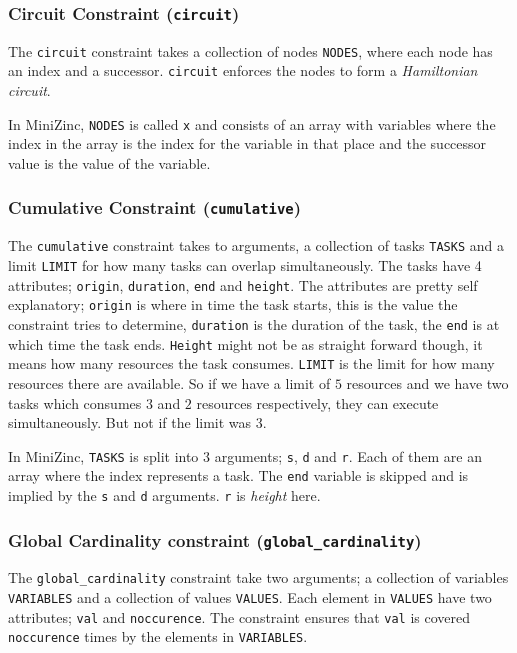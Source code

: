 \subsubsection{Circuit Constraint (\texttt{circuit})}
The \texttt{circuit} constraint takes a collection of nodes \texttt{NODES}, where each node has an index and a successor. \texttt{circuit} enforces the nodes to form a \emph{Hamiltonian circuit}.

In MiniZinc, \texttt{NODES} is called \texttt{x} and consists of an array with variables where the index in the array is the index for the variable in that place and the successor value is the value of the variable.

\subsubsection{Cumulative Constraint (\texttt{cumulative})}
The \texttt{cumulative} constraint takes to arguments, a collection of tasks \texttt{TASKS} and a limit \texttt{LIMIT} for how many tasks can overlap simultaneously. The tasks have 4 attributes; \texttt{origin}, \texttt{duration}, \texttt{end} and \texttt{height}. The attributes are pretty self explanatory; \texttt{origin} is where in time the task starts, this is the value the constraint tries to determine, \texttt{duration} is the duration of the task, the \texttt{end} is at which time the task ends. \texttt{Height} might not be as straight forward though, it means how many resources the task consumes. \texttt{LIMIT} is the limit for how many resources there are available. So if we have a limit of $5$ resources and we have two tasks which consumes $3$ and $2$ resources respectively, they can execute simultaneously. But not if the limit was $3$.

In MiniZinc, \texttt{TASKS} is split into $3$ arguments; \texttt{s}, \texttt{d} and \texttt{r}. Each of them are an array where the index represents a task. The \texttt{end} variable is skipped and is implied by the \texttt{s} and \texttt{d} arguments. \texttt{r} is \emph{height} here.

\subsubsection{Global Cardinality constraint (\texttt{global\_cardinality})}
The \texttt{global\_cardinality} constraint take two arguments; a collection of variables \texttt{VARIABLES} and a collection of values \texttt{VALUES}. Each element in \texttt{VALUES} have two attributes; \texttt{val} and \texttt{noccurence}. The constraint ensures that \texttt{val} is covered \linebreak\texttt{noccurence} times by the elements in \texttt{VARIABLES}.

